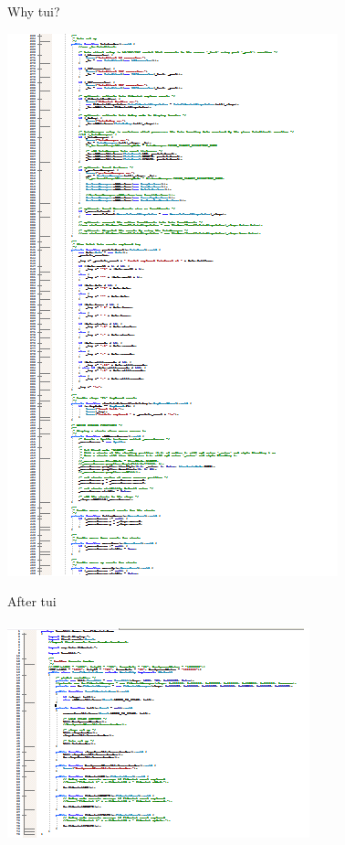 \begin{frame}
\begin{block}{Why tui?}
\begin{minipage}{1.0\linewidth}
\begin{center}
\begin{minipage}{.39\linewidth}
\begin{center}
\includegraphics[scale=0.18]{images/old_part2.png}
\end{center}
\end{minipage}%
\begin{minipage}{.59\linewidth}
\begin{center}
After tui\\$\;$\\
\includegraphics[scale=0.18]{images/new_code.png} 
\end{center}
\end{minipage}
\end{center}
\end{minipage}
\end{block}
\end{frame}

